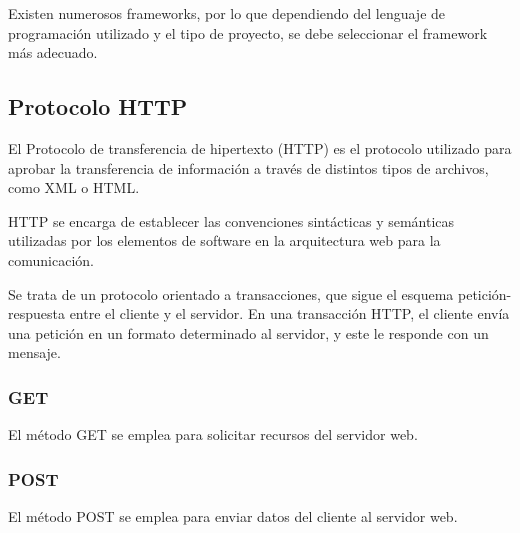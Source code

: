 Existen numerosos frameworks, por lo que dependiendo del lenguaje de programación utilizado y el tipo de proyecto, se debe seleccionar el framework más adecuado.

\subsection{Protocolo HTTP}
\cite{http} El Protocolo de transferencia de hipertexto (HTTP) es el protocolo utilizado para aprobar la transferencia de información a través de distintos tipos de archivos, como XML o HTML.

HTTP se encarga de establecer las convenciones sintácticas y semánticas utilizadas por los elementos de software en la arquitectura web para la comunicación. 

Se trata de un protocolo orientado a transacciones, que sigue el esquema petición-respuesta entre el cliente y el servidor. En una transacción HTTP, el cliente envía una petición en un formato determinado al servidor, y este le responde con un mensaje.


\subsubsection{GET}
\cite{getypost} El método GET se emplea para solicitar recursos del servidor web.

\subsubsection{POST}
\cite{getypost} El método POST se emplea para enviar datos del cliente al servidor web.

